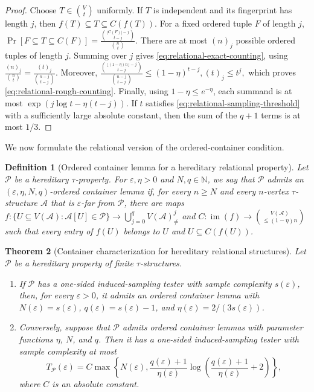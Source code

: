 \documentclass[11pt,reqno,letterpaper]{amsart}
\newcommand{\N}{{\mathbb N}}
\newcommand{\cA}{{\mathcal A}}
\newcommand{\cP}{{\mathcal P}}
\theoremstyle{plain}
\newtheorem{thm}{Theorem}[section]
\newtheorem{defn}[thm]{Definition}
\theoremstyle{remark}
\begin{document}
\begin{proof}
Choose $T\in\binom{V}{t}$ uniformly.  If $T$ is independent and its fingerprint
has length $j$, then $f(T)\subseteq T\subseteq C(f(T))$.  For a fixed ordered
tuple $F$ of length $j$,
\(\Pr[F\subseteq T\subseteq C(F)] =\frac{\binom{|C(F)|-j}{t-j}}{\binom{n}{t}}.\)
There are at most $(n)_j$ possible ordered tuples of length $j$.  Summing over
$j$ gives \eqref{eq:relational-exact-counting}, using
\(\frac{(n)_j}{\binom{n}{t}} =\frac{(t)_j}{\binom{n-j}{t-j}}.\)
Moreover,
\(\frac{\binom{\lfloor(1-\eta)n\rfloor-j}{t-j}} {\binom{n-j}{t-j}} \leq(1-\eta)^{t-j},  (t)_j\leq t^j,\)
which proves \eqref{eq:relational-rough-counting}.  Finally, using
$1-\eta\leq e^{-\eta}$, each summand is at most
$\exp(j\log t-\eta(t-j))$.  If $t$ satisfies
\eqref{eq:relational-sampling-threshold} with a sufficiently large absolute
constant, then the sum of the $q+1$ terms is at most $1/3$.
\end{proof}

We now formulate the relational version of the ordered-container condition.

\begin{defn}[Ordered container lemma for a hereditary relational property]
Let $\cP$ be a hereditary $\tau$-property.  For
$\varepsilon,\eta>0$ and $N,q\in\N$, we say that $\cP$ admits an
$(\varepsilon,\eta,N,q)$-ordered container lemma if, for every
$n\geq N$ and every $n$-vertex $\tau$-structure $\cA$ that is
$\varepsilon$-far from $\cP$, there are maps
\(f:\{U\subseteq V(\cA):\cA[U]\in\cP\} \longrightarrow\bigcup_{j=0}^{q}V(\cA)_{\neq}^{j}\)
and
\(C:\operatorname{im}(f) \longrightarrow\binom{V(\cA)}{\leq(1-\eta)n}\)
such that every entry of $f(U)$ belongs to $U$ and
$U\subseteq C(f(U))$.
\end{defn}

\begin{thm}[Container characterization for hereditary relational structures]
\label{thm:relational-hereditary-characterization}
Let $\cP$ be a hereditary property of finite $\tau$-structures.
\begin{enumerate}
\item If $\cP$ has a one-sided induced-sampling tester with sample
complexity $s(\varepsilon)$, then, for every $\varepsilon>0$, it admits an
ordered container lemma with
\(N(\varepsilon)=s(\varepsilon)\), \(q(\varepsilon)=s(\varepsilon)-1\), and \(\eta(\varepsilon)={2}/{(3s(\varepsilon))}\).

\item Conversely, suppose that $\cP$ admits ordered container lemmas
with parameter functions $\eta$, $N$, and $q$.  Then it has a one-sided
induced-sampling tester with sample complexity at most
\begin{equation}
\label{eq:relational-hereditary-sample}
T_{\cP}(\varepsilon)
=C\max\left\{
N(\varepsilon),
\frac{q(\varepsilon)+1}{\eta(\varepsilon)}
\log\left(
\frac{q(\varepsilon)+1}{\eta(\varepsilon)}+2
\right)
\right\},
\end{equation}
where $C$ is an absolute constant.
\end{enumerate}
\end{thm}
\end{document}
